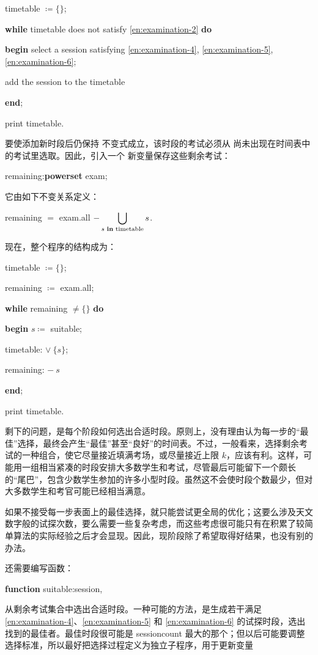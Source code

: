 \quad timetable $\coloneq \{\}$;

\quad \textbf{while} timetable does not satisfy \ref{en:examination-2} \textbf{do}

\quad \textbf{begin} select a session satisfying \ref{en:examination-4}, \ref{en:examination-5}, \ref{en:examination-6};

\quad \quad add the session to the timetable

\quad \textbf{end};

\quad print timetable.

要使添加新时段后仍保持
不变式成立，该时段的考试必须从
尚未出现在时间表中的考试里选取。因此，引入一个
新变量保存这些剩余考试：

\quad remaining:\textbf{powerset} exam;

\noindent
它由如下不变关系定义：

\quad remaining $=$ exam.all $- \displaystyle\bigcup_{s \text{ \textbf{in} timetable}} s$.

\noindent
现在，整个程序的结构成为：

\quad timetable $\coloneq \{\}$;

\quad remaining $\coloneq$ exam.all;

\quad \textbf{while} remaining $\neq \{\}$ \textbf{do}

\quad \quad \textbf{begin} $s\coloneq$ suitable;

\quad \quad \quad timetable: $\vee\ \{s\}$;

\quad \quad \quad remaining: $-\ s$

\quad \quad \textbf{end};

\quad print timetable.

剩下的问题，是每个阶段如何选出合适时段。原则上，没有理由认为每一步的“最佳”选择，最终会产生“最佳”甚至“良好”的时间表。不过，一般看来，选择剩余考试的一种组合，使它尽量接近填满考场，或尽量接近上限 $k$，应该有利。这样，可能用一组相当紧凑的时段安排大多数学生和考试，尽管最后可能留下一个颇长的“尾巴”，包含少数学生参加的许多小型时段。虽然这不会使时段个数最少，但对大多数学生和考官可能已经相当满意。

如果不接受每一步表面上的最佳选择，就只能尝试更全局的优化；这要么涉及天文数字般的试探次数，要么需要一些复杂考虑，而这些考虑很可能只有在积累了较简单算法的实际经验之后才会显现。因此，现阶段除了希望取得好结果，也没有别的办法。

还需要编写函数：

\quad \textbf{function} suitable:session,

\noindent
从剩余考试集合中选出合适时段。一种可能的方法，是生成若干满足 \ref{en:examination-4}、\ref{en:examination-5} 和 \ref{en:examination-6} 的试探时段，选出找到的最佳者。最佳时段很可能是 sessioncount 最大的那个；但以后可能要调整选择标准，所以最好把选择过程定义为独立子程序，用于更新变量

